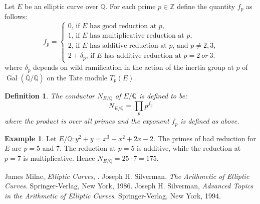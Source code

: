 \documentclass[12pt]{article}
\newtheorem*{defn}{Definition}
\theoremstyle{definition}
\newtheorem*{exa}{Example}
\begin{document}
Let $E$ be an elliptic curve over $\mathbb{Q}$. For each prime
$p\in \mathbb{Z}$ define the quantity $f_p$ as follows:
$$f_p =
\begin{cases}
0 \text{, if $E$ has good reduction at $p$,}\\
1 \text{, if $E$ has multiplicative reduction at $p$,}\\
2 \text{, if $E$ has additive reduction at $p$, and $p\neq
2,3$,}\\
2+\delta_p \text{, if $E$ has additive reduction at $p=2\ or\ 3$.}
\end{cases}
$$
where $\delta_p$ depends on wild ramification in the action of the
inertia group at $p$ of
$\operatorname{Gal}(\bar{\mathbb{Q}}/\mathbb{Q})$ on the Tate
module $T_p(E)$.

\begin{defn}
The conductor $N_{E/\mathbb{Q}}$ of ${E/\mathbb{Q}}$ is defined to
be:
$$N_{E/\mathbb{Q}}=\prod_p p^{f_p}$$
where the product is over all primes and the exponent $f_p$ is
defined as above.
\end{defn}

\begin{exa}
Let $E/\mathbb{Q}\colon y^2+y=x^3-x^2+2x-2$. The primes of bad
reduction for $E$ are $p=5$ and $7$. The reduction at $p=5$ is
additive, while the reduction at $p=7$ is multiplicative. Hence
$N_{E/\mathbb{Q}}=25\cdot 7 = 175$.
\end{exa}

\begin{thebibliography}{9}
 James Milne, {\em Elliptic Curves}, .
 Joseph H. Silverman, {\em The Arithmetic of Elliptic Curves}. Springer-Verlag, New York, 1986.
 Joseph H. Silverman, {\em Advanced Topics in
the Arithmetic of Elliptic Curves}. Springer-Verlag, New York,
1994.
\end{thebibliography}
\end{document}
